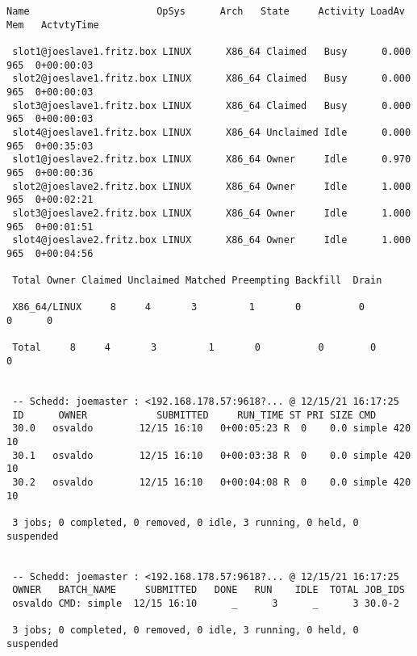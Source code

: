 \begin{lstlisting}[style=output_tiny]
 Name                      OpSys      Arch   State     Activity LoadAv Mem   ActvtyTime
 
 slot1@joeslave1.fritz.box LINUX      X86_64 Claimed   Busy      0.000  965  0+00:00:03
 slot2@joeslave1.fritz.box LINUX      X86_64 Claimed   Busy      0.000  965  0+00:00:03
 slot3@joeslave1.fritz.box LINUX      X86_64 Claimed   Busy      0.000  965  0+00:00:03
 slot4@joeslave1.fritz.box LINUX      X86_64 Unclaimed Idle      0.000  965  0+00:35:03
 slot1@joeslave2.fritz.box LINUX      X86_64 Owner     Idle      0.970  965  0+00:00:36
 slot2@joeslave2.fritz.box LINUX      X86_64 Owner     Idle      1.000  965  0+00:02:21
 slot3@joeslave2.fritz.box LINUX      X86_64 Owner     Idle      1.000  965  0+00:01:51
 slot4@joeslave2.fritz.box LINUX      X86_64 Owner     Idle      1.000  965  0+00:04:56
 
 Total Owner Claimed Unclaimed Matched Preempting Backfill  Drain
 
 X86_64/LINUX     8     4       3         1       0          0        0      0
 
 Total     8     4       3         1       0          0        0      0
 
 
 -- Schedd: joemaster : <192.168.178.57:9618?... @ 12/15/21 16:17:25
 ID      OWNER            SUBMITTED     RUN_TIME ST PRI SIZE CMD
 30.0   osvaldo        12/15 16:10   0+00:05:23 R  0    0.0 simple 420 10
 30.1   osvaldo        12/15 16:10   0+00:03:38 R  0    0.0 simple 420 10
 30.2   osvaldo        12/15 16:10   0+00:04:08 R  0    0.0 simple 420 10
 
 3 jobs; 0 completed, 0 removed, 0 idle, 3 running, 0 held, 0 suspended
 
 
 -- Schedd: joemaster : <192.168.178.57:9618?... @ 12/15/21 16:17:25
 OWNER   BATCH_NAME     SUBMITTED   DONE   RUN    IDLE  TOTAL JOB_IDS
 osvaldo CMD: simple  12/15 16:10      _      3      _      3 30.0-2
 
 3 jobs; 0 completed, 0 removed, 0 idle, 3 running, 0 held, 0 suspended

 
\end{lstlisting}